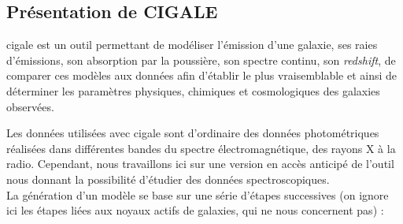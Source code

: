\documentclass[12pt, a4paper]{article}
\begin{document}
\subsection{Présentation de CIGALE}

\gls{cigale} \parencite{cigale} est un outil permettant de modéliser l'émission d'une galaxie, ses raies d'émissions, son absorption par la poussière, son spectre continu, son \textit{redshift}, de comparer ces modèles aux données afin d'établir le plus vraisemblable et ainsi de déterminer les paramètres physiques, chimiques et cosmologiques des galaxies observées.

Les données utilisées avec \gls{cigale} sont d'ordinaire des données photométriques réalisées dans différentes bandes du spectre électromagnétique, des rayons X à la radio. Cependant, nous travaillons ici sur une version en accès anticipé de l'outil nous donnant la possibilité d'étudier des données spectroscopiques.\\

La génération d'un modèle se base sur une série d'étapes successives (on ignore ici les étapes liées aux noyaux actifs de galaxies, qui ne nous concernent pas) :
\end{document}
